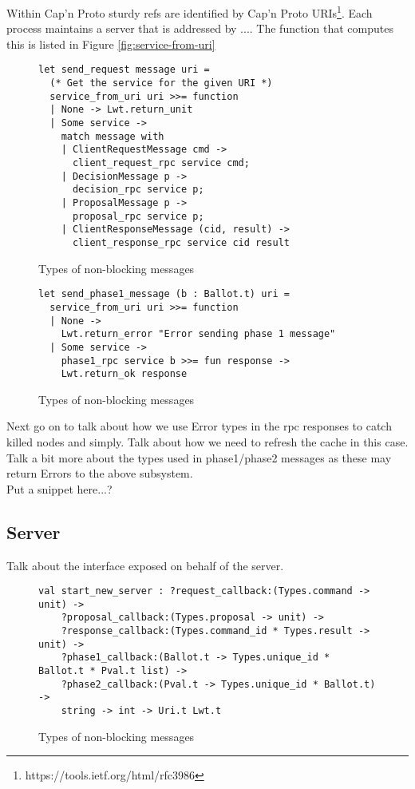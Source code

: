 Within Cap'n Proto sturdy refs are identified by Cap'n Proto URIs\footnote{https://tools.ietf.org/html/rfc3986}. Each process maintains a server that is addressed by .... The function that computes this is listed in Figure \ref{fig:service-from-uri} \\

\begin{figure}
  \begin{lstlisting}
let send_request message uri =
  (* Get the service for the given URI *)
  service_from_uri uri >>= function
  | None -> Lwt.return_unit
  | Some service ->
    match message with
    | ClientRequestMessage cmd ->
      client_request_rpc service cmd;
    | DecisionMessage p ->
      decision_rpc service p;
    | ProposalMessage p ->
      proposal_rpc service p;
    | ClientResponseMessage (cid, result) ->
      client_response_rpc service cid result
  \end{lstlisting}
  \centering
  \caption{Types of non-blocking messages}
\end{figure}

\begin{figure}
  \begin{lstlisting}
let send_phase1_message (b : Ballot.t) uri = 
  service_from_uri uri >>= function 
  | None ->
    Lwt.return_error "Error sending phase 1 message"  
  | Some service -> 
    phase1_rpc service b >>= fun response ->
    Lwt.return_ok response
  \end{lstlisting}
  \centering
  \caption{Types of non-blocking messages}
\end{figure}



Next go on to talk about how we use Error types in the rpc responses to catch killed nodes and simply. Talk about how we need to refresh the cache in this case. Talk a bit more about the types used in phase1/phase2 messages as these may return Errors to the above subsystem. \\

{\color{red}Put a snippet here...?}

\subsection{Server}

Talk about the interface exposed on behalf of the server.

\begin{figure}
  \begin{lstlisting}
val start_new_server : ?request_callback:(Types.command -> unit) ->
    ?proposal_callback:(Types.proposal -> unit) ->
    ?response_callback:(Types.command_id * Types.result -> unit) ->
    ?phase1_callback:(Ballot.t -> Types.unique_id * Ballot.t * Pval.t list) ->
    ?phase2_callback:(Pval.t -> Types.unique_id * Ballot.t) ->
    string -> int -> Uri.t Lwt.t  
  \end{lstlisting}
  \centering
  \caption{Types of non-blocking messages}
\end{figure}


